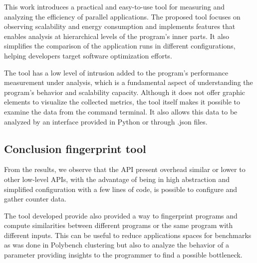 This work introduces a practical and easy-to-use tool for measuring and analyzing the efficiency of parallel applications. The proposed tool focuses on observing scalability and energy consumption and implements features that enables analysis at hierarchical levels of the program's inner parts. It also simplifies the comparison of the application runs in different configurations, helping developers target software optimization efforts.

The tool has a low level of intrusion added to the program's performance measurement under analysis, which is a fundamental aspect of understanding the program's behavior and scalability capacity. 
Although it does not offer graphic elements to visualize the collected metrics, the tool itself makes it possible to examine the data from the command terminal. It also allows this data to be analyzed by an interface provided in Python or through .json files. 


\subsection{Conclusion fingerprint tool}

From the results, we observe that the API present overhead similar or lower to other low-level APIs, with the advantage of being in high abstraction and simplified configuration with a few lines of code, is possible to configure and gather counter data.

The tool developed provide also provided a way to fingerprint programs and compute similarities between different programs or the same program with different inputs. This can be useful to reduce applications spaces for benchmarks as was done in Polybench clustering but also to analyze the behavior of a parameter providing insights to the programmer to find a possible bottleneck.

